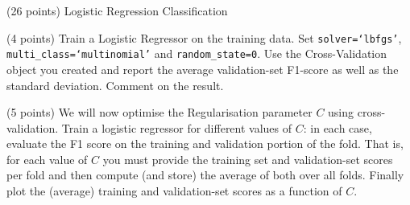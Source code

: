 \documentclass[12pt]{article}
\begin{document}
\begin{question}{(26 points) Logistic Regression Classification}
\begin{subquestion}



\end{subquestion}

\begin{subquestion}{(4 points) Train a Logistic Regressor on the training data. Set \texttt{solver=`lbfgs'}, \texttt{multi\_class=`multinomial'} and \texttt{random\_state=0}. Use the Cross-Validation object you created and report the average validation-set F1-score as well as the standard deviation. Comment on the result.}






\end{subquestion}

\begin{subquestion}{\label{Q_LOG_REG_PLT}(5 points) We will now optimise the Regularisation parameter $C$ using cross-validation. Train a logistic regressor for different values of $C$: in each case, evaluate the F1 score on the training and validation portion of the fold. That is, for each value of $C$ you must provide the training set and validation-set scores per fold and then compute (and store) the average of both over all folds. Finally plot the (average) training and validation-set scores as a function of $C$. }







\end{subquestion}
\end{question}
\end{document}
